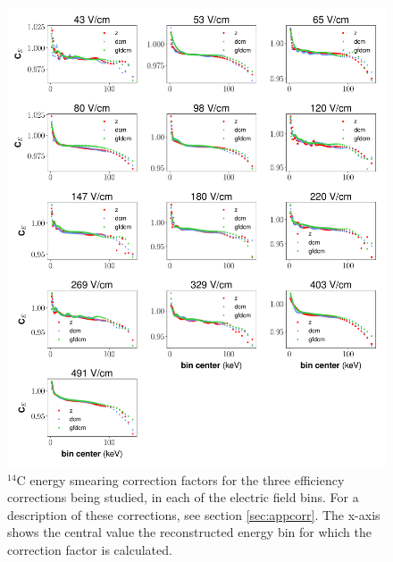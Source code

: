 \begin{figure}[h!]
\centering
\includegraphics[width=\textwidth]{Figures/C14_C_Energy_prelim.pdf}
\caption{$^{14}$C energy smearing correction factors for the three efficiency corrections being studied, in each of the electric field bins. For a description of these corrections, see section \ref{sec:appcorr}. The x-axis shows the central value the reconstructed energy bin for which the correction factor is calculated.}
\label{fig:C14_CE_prelim}
\end{figure}
